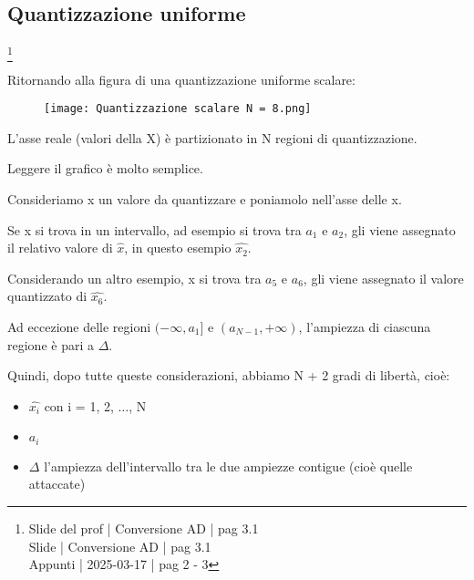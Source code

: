 \newpage 

\subsection{Quantizzazione uniforme}
\footnote{Slide del prof | Conversione AD | pag 3.1 \\  
Slide | Conversione AD | pag 3.1 \\ 
Appunti | 2025-03-17 | pag 2 - 3
}

Ritornando alla figura di una quantizzazione uniforme scalare: 

\begin{figure}[h]
    \centering
    \texttt{[image: Quantizzazione scalare N = 8.png]}
\end{figure}

L'asse reale (valori della X) è partizionato in N regioni di quantizzazione. \newline 

\begin{tcolorbox}
    Leggere il grafico è molto semplice. \newline 

    Consideriamo x un valore da quantizzare e poniamolo nell'asse delle x. \newline 

    Se x si trova in un intervallo, ad esempio si trova tra $a_1$ e $a_2$, gli viene assegnato il relativo valore di $\hat{x}$, in questo esempio $\hat{x_2}$. \newline 

    Considerando un altro esempio, x si trova tra $a_5$ e $a_6$, gli viene assegnato il valore quantizzato di $\hat{x_6}$. 
\end{tcolorbox}

Ad eccezione delle regioni $( -\infty, a_1]$ e $(a_{N-1}, + \infty)$, 
l'ampiezza di ciascuna regione è pari a $\Delta$. \newline

Quindi, dopo tutte queste considerazioni, abbiamo N + 2 gradi di libertà, cioè: 

\begin{itemize}
    \item $\hat{x_i}$ con i = 1, 2, $\dots$, N 
    \item $a_i$ 
    \item $\Delta$ l'ampiezza dell'intervallo tra le due ampiezze contigue (cioè quelle attaccate)
\end{itemize}



